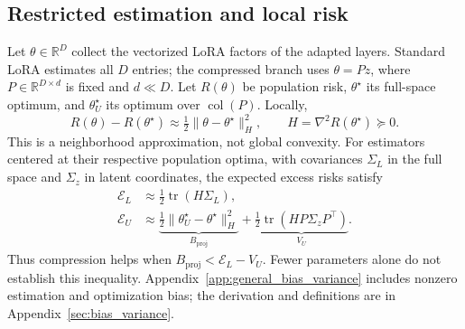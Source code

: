 \subsection{Restricted estimation and local risk}
Let $\theta\in\mathbb R^D$ collect the vectorized LoRA factors of the adapted layers. Standard LoRA estimates all $D$ entries; the compressed branch uses $\theta=Pz$, where $P\in\mathbb R^{D\times d}$ is fixed and $d\ll D$. Let $R(\theta)$ be population risk, $\theta^\star$ its full-space optimum, and $\theta_U^\star$ its optimum over $\operatorname{col}(P)$. Locally,
\begin{equation}
 R(\theta)-R(\theta^\star)\approx\tfrac12\|\theta-\theta^\star\|_H^2,
 \qquad H=\nabla^2R(\theta^\star)\succeq0.
 \label{main:quadratic}
\end{equation}
This is a neighborhood approximation, not global convexity. For estimators centered at their respective population optima, with covariances $\Sigma_L$ in the full space and $\Sigma_z$ in latent coordinates, the expected excess risks satisfy
\begin{align}
 \mathcal E_L&\approx\tfrac12\operatorname{tr}(H\Sigma_L),\nonumber\\
 \mathcal E_U&\approx
 \underbrace{\tfrac12\|\theta_U^\star-\theta^\star\|_H^2}_{B_{\mathrm{proj}}}
 +\underbrace{\tfrac12\operatorname{tr}(HP\Sigma_zP^\top)}_{V_U}.
 \label{main:decomp}
\end{align}
Thus compression helps when $B_{\mathrm{proj}}<\mathcal E_L-V_U$. Fewer parameters alone do not establish this inequality. Appendix~\ref{app:general_bias_variance} includes nonzero estimation and optimization bias; the derivation and definitions are in Appendix~\ref{sec:bias_variance}.

